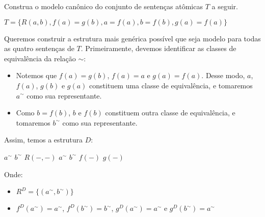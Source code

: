 \begin{rexercises}
    \begin{question}
        Construa o modelo canônico do conjunto de sentenças atômicas $T$ a seguir.
        \begin{center}
            $T = \{R(a, b), f(a) = g(b), a = f(a), b = f(b), g(a) = f(a)\}$
        \end{center}
        \begin{resolution}
            Queremos construir a estrutura mais genérica possível que seja modelo para todas as quatro sentenças de $T$. Primeiramente, devemos identificar as classes de equivalência da relação $\sim$:
            \begin{itemize}
                \item Notemos que $f(a) = g(b)$, $f(a) = a$ e $g(a) = f(a)$. Desse modo, $a$, $f(a)$, $g(b)$ e $g(a)$ constituem uma classe de equivalência, e tomaremos $a^\sim$ como sua representante.
                \item Como $b = f(b)$, $b$ e $f(b)$ constituem outra classe de equivalência, e tomaremos $b^\sim$ como sua representante. 
            \end{itemize}
            Assim, temos a estrutura $D$:

            \begin{center}
                \begin{structure}
                    {}
                    {$a^\sim$ $b^\sim$}
                    {$R(-,-)$}
                    {$a^\sim$ $b^\sim$}
                    {$f(-)$ $g(-)$}
                \end{structure}
            \end{center}

            Onde:
            \begin{itemize}
                \item [] $R^D = \{(a^\sim, b^\sim)\}$
                \item [] $f^D(a^\sim) = a^\sim$, $f^D(b^\sim) = b^\sim$, $g^D(a^\sim) = a^\sim$ e $g^D(b^\sim) = a^\sim$
            \end{itemize}
        \end{resolution}
    \end{question}
\end{rexercises}

